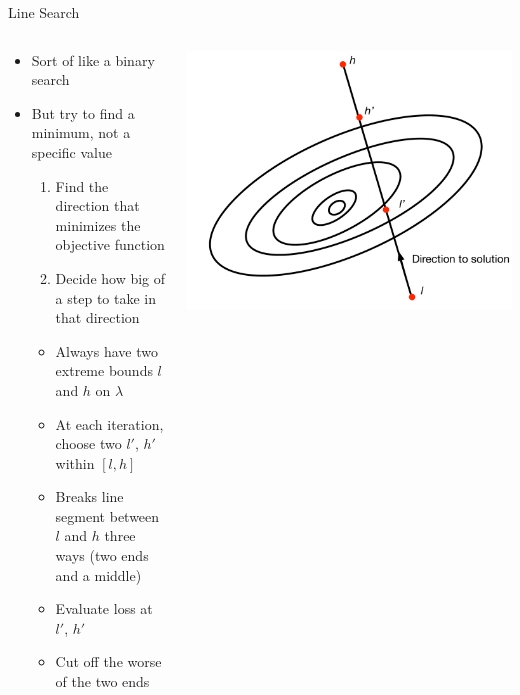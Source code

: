 \documentclass[aspectratio=169]{beamer}
\begin{document}
\begin{frame}{Line Search}

\begin{columns}[T]
\begin{column}{0.6\textwidth}
\begin{itemize}
\item Sort of like a binary search
\item But try to find a minimum, not a specific value
\begin{enumerate}
\item Find the direction that minimizes the objective function
\item Decide how big of a step to take in that direction
\end{enumerate}
\begin{itemize}
\item Always have two extreme bounds $l$ and $h$ on $\lambda$
\item At each iteration, choose two $l'$, $h'$ within $[l, h]$ 
\item Breaks line segment between $l$ and $h$ three ways (two ends and a middle)
\item Evaluate loss at $l'$, $h'$
\item Cut off the worse of the two ends
	\end{itemize}
\end{itemize}
\end{column}
\begin{column}{0.4\textwidth}
\includegraphics[width=1\textwidth]{lectGD/lineSearchHighLevel.pdf}
\end{column}
\end{columns}
	
\end{frame}
\end{document}
